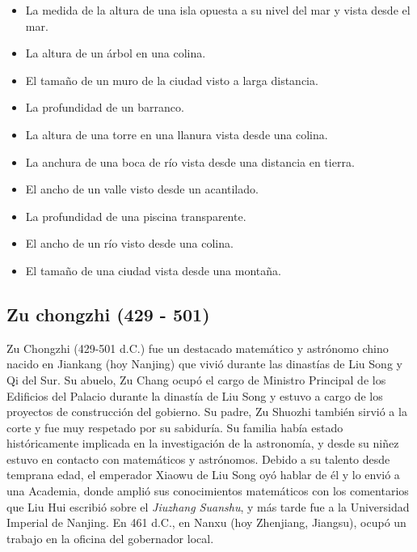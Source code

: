 \documentclass[a4paper, 11pt]{article}
\begin{document}
		\begin{itemize}
			\item La medida de la altura de una isla opuesta a su nivel del mar y vista desde el mar.
			\item La altura de un árbol en una colina.
			\item El tamaño de un muro de la ciudad visto a larga distancia.
			\item La profundidad de un barranco.
			\item La altura de una torre en una llanura vista desde una colina.
			\item La anchura de una boca de río vista desde una distancia en tierra.
			\item El ancho de un valle visto desde un acantilado.
			\item La profundidad de una piscina transparente.
			\item El ancho de un río visto desde una colina.
			\item El tamaño de una ciudad vista desde una montaña.
		\end{itemize}

	\subsection{Zu chongzhi (429 - 501)}
		Zu Chongzhi (429-501 d.C.) fue un destacado matemático y astrónomo chino nacido en Jiankang (hoy Nanjing) que
		vivió durante las dinastías de Liu Song y Qi del Sur. Su abuelo, Zu Chang ocupó el cargo de Ministro Principal
		de los Edificios del Palacio durante la dinastía de Liu Song y estuvo a cargo de los proyectos de construcción
		del gobierno. Su padre, Zu Shuozhi también sirvió a la corte y fue muy respetado por su sabiduría. Su familia
		había estado históricamente implicada en la investigación de la astronomía, y desde su niñez estuvo en contacto
		con matemáticos y astrónomos. Debido a su talento desde temprana edad, el emperador Xiaowu de Liu Song oyó hablar
		de él y lo envió a una Academia, donde amplió sus conocimientos matemáticos con los comentarios que Liu Hui
		escribió sobre el \textit{Jiuzhang Suanshu}, y más tarde fue a la Universidad Imperial de Nanjing. En 461 d.C.,
		en Nanxu (hoy Zhenjiang, Jiangsu), ocupó un trabajo en la oficina del gobernador local.
		
\end{document}

